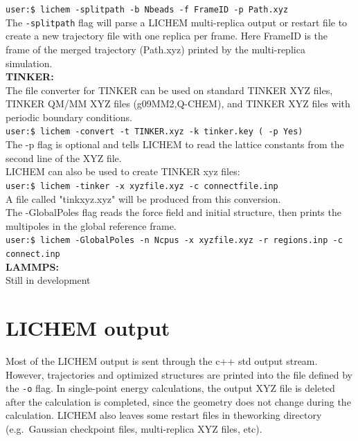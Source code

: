 \documentclass[12pt]{report}
\begin{document}
\texttt{user:\$ lichem -splitpath -b Nbeads -f FrameID -p Path.xyz} \\

The \texttt{-splitpath} flag will parse a LICHEM multi-replica output or restart file to
create a new trajectory file with one replica per frame.
Here FrameID is the frame of the merged trajectory (Path.xyz) printed by the
multi-replica simulation. \\

{\textbf{TINKER:}} \\

The file converter for TINKER can be used on standard TINKER XYZ files,
TINKER QM/MM XYZ files (g09MM2,Q-CHEM), and TINKER XYZ files with periodic
boundary conditions. \\

\texttt{user:\$ lichem -convert -t TINKER.xyz -k tinker.key ( -p Yes)} \\

The -p flag is optional and tells LICHEM to read the lattice constants from
the second line of the XYZ file. \\

LICHEM can also be used to create TINKER xyz files: \\

\texttt{user:\$ lichem -tinker -x xyzfile.xyz -c connectfile.inp} \\

A file called "tinkxyz.xyz" will be produced from this conversion. \\

The -GlobalPoles flag reads the force field and initial structure, then prints
the multipoles in the global reference frame. \\

\texttt{user:\$ lichem -GlobalPoles -n Ncpus 
-x xyzfile.xyz -r regions.inp
 -c connect.inp} \\

{\textbf{LAMMPS:}} \\

{\color{red}Still in development}

\section{LICHEM output}

Most of the LICHEM output is sent through the c++ std output stream.
However, trajectories and optimized structures are printed into the file
defined by the \texttt{-o} flag.
In single-point energy calculations, the output XYZ file is deleted after the
calculation is completed, since the geometry does not change during the
calculation.
LICHEM also leaves some restart files in theworking directory (e.g.\ Gaussian
checkpoint files, multi-replica XYZ files, etc).
\end{document}
